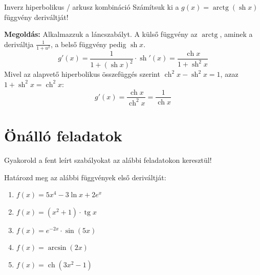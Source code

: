 \documentclass[11pt,a4paper]{article}
\begin{document}
\begin{examplebox}{Inverz hiperbolikus / arkusz kombináció}
Számítsuk ki a $g(x) = \operatorname{arctg}(\operatorname{sh} x)$ függvény deriváltját!
\vspace{0.2cm}

\textbf{Megoldás:}
Alkalmazzuk a láncszabályt. A külső függvény az $\operatorname{arctg}$, aminek a deriváltja $\frac{1}{1 + u^2}$, a belső függvény pedig $\operatorname{sh} x$.
\[
g'(x) = \frac{1}{1 + (\operatorname{sh} x)^2} \cdot \operatorname{sh}'(x) = \frac{\operatorname{ch} x}{1 + \operatorname{sh}^2 x}
\]
Mivel az alapvető hiperbolikus összefüggés szerint $\operatorname{ch}^2 x - \operatorname{sh}^2 x = 1$, azaz $1 + \operatorname{sh}^2 x = \operatorname{ch}^2 x$:
\[
g'(x) = \frac{\operatorname{ch} x}{\operatorname{ch}^2 x} = \frac{1}{\operatorname{ch} x}
\]
\end{examplebox}

\section{Önálló feladatok}
Gyakorold a fent leírt szabályokat az alábbi feladatokon keresztül!

\begin{exercisebox}
Határozd meg az alábbi függvények első deriváltját:
\begin{enumerate}
    \item $f(x) = 5x^4 - 3\ln x + 2e^x$
    \item $f(x) = (x^2 + 1) \cdot \operatorname{tg} x$
    \item $f(x) = e^{-2x} \cdot \sin(5x)$
    \item $f(x) = \arcsin(2x)$
    \item $f(x) = \operatorname{ch}(3x^2 - 1)$
\end{enumerate}
\end{exercisebox}
\end{document}
